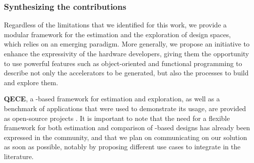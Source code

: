 \subsubsection{Synthesizing the contributions}
Regardless of the limitations that we identified for this work, we provide a modular framework for the estimation and the exploration of design spaces, which relies on an emerging paradigm.
More generally, we propose an initiative to enhance the expressivity of the hardware developers, giving them the opportunity to use powerful features such as object-oriented and functional programming to describe not only the accelerators to be generated, but also the processes to build and explore them.

{\bf QECE}, a \chisel-based framework for estimation and exploration, as well as a benchmark of applications that were used to demonstrate its usage, are provided as open-source projects \cite{ferres_qece_2021}\cite{ferres_benchmark_2021}.
It is important to note that the need for a flexible framework for both estimation and comparison of \chisel-based designs has already been expressed in the community, and that we plan on communicating on our solution as soon as possible, notably by proposing different use cases to integrate in the literature.

